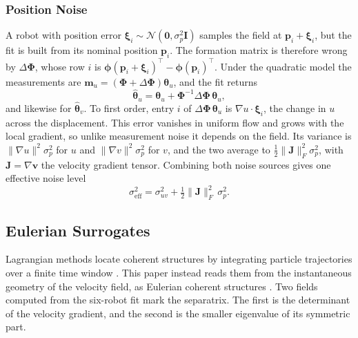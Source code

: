 \documentclass[lettersize,journal]{IEEEtran}
\begin{document}
\subsubsection{Position Noise}
A robot with position error
$\boldsymbol{\xi}_i \sim \mathcal{N}(\mathbf{0}, \sigma_p^2\mathbf{I})$
samples the field at $\mathbf{p}_i + \boldsymbol{\xi}_i$, but the fit is
built from its nominal position $\mathbf{p}_i$. The formation matrix is
therefore wrong by $\Delta\boldsymbol{\Phi}$, whose row $i$ is
$\boldsymbol{\phi}(\mathbf{p}_i + \boldsymbol{\xi}_i)^{\top} -
\boldsymbol{\phi}(\mathbf{p}_i)^{\top}$. Under the quadratic model the
measurements are
$\mathbf{m}_u = (\boldsymbol{\Phi} + \Delta\boldsymbol{\Phi})
\boldsymbol{\theta}_u$, and the fit returns
\begin{equation}
    \hat{\boldsymbol{\theta}}_u = \boldsymbol{\theta}_u
        + \boldsymbol{\Phi}^{-1}\Delta\boldsymbol{\Phi}\,
          \boldsymbol{\theta}_u ,
    \label{eq:pos_noise}
\end{equation}
and likewise for $\hat{\boldsymbol{\theta}}_v$. To first order, entry
$i$ of $\Delta\boldsymbol{\Phi}\,\boldsymbol{\theta}_u$ is
$\nabla u \cdot \boldsymbol{\xi}_i$, the change in $u$ across the
displacement. This error vanishes in uniform flow and grows with the
local gradient, so unlike measurement noise it depends on the field.
Its variance is $\lVert\nabla u\rVert^2\sigma_p^2$ for $u$ and
$\lVert\nabla v\rVert^2\sigma_p^2$ for $v$, and the two average to
$\tfrac{1}{2}\lVert\mathbf{J}\rVert_F^2\sigma_p^2$, with $\mathbf{J} = \nabla\mathbf{v}$ the velocity gradient tensor. Combining both noise
sources gives one effective noise level
\begin{equation}
    \sigma_{\mathrm{eff}}^2 = \sigma_{uv}^2
        + \tfrac{1}{2}\lVert\mathbf{J}\rVert_F^2\,\sigma_p^2 .
    \label{eq:sigma_eff}
\end{equation}



\subsection{Eulerian Surrogates}
\label{sec:surrogates}

Lagrangian methods locate coherent structures by integrating particle
trajectories over a finite time window \cite{16,17}. This paper instead
reads them from the instantaneous geometry of the velocity field, as
Eulerian coherent structures \cite{19}. Two fields computed from the
six-robot fit mark the separatrix. The first is the determinant of the velocity
gradient, and the second is the smaller eigenvalue of its symmetric
part.
\end{document}
